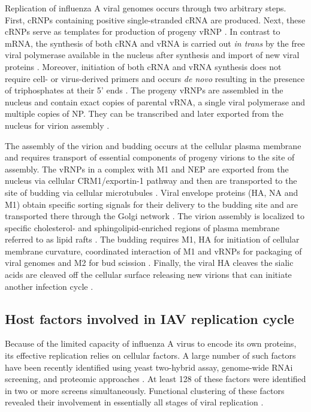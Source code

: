 	Replication of influenza A viral genomes occurs through two arbitrary steps. First, \gls{cRNP}s containing positive single-stranded cRNA are produced. Next, these \gls{cRNP}s serve as templates for production of progeny \gls{vRNP} \parencite{Elton2005}. In contrast to mRNA, the synthesis of both cRNA and vRNA is carried out \textit{in trans} by the free viral polymerase available in the nucleus after synthesis and import of new viral proteins \parencite{Jorba2009, Moeller2012}. Moreover, initiation of both cRNA and vRNA synthesis does not require cell- or virus-derived primers and occurs \textit{de novo} resulting in the presence of triphosphates at their 5' ends \parencite{Hay1982, Zhang2010}. The progeny \gls{vRNP}s are assembled in the nucleus and contain exact copies of parental vRNA, a single viral polymerase and multiple copies of \gls{NP}. They can be transcribed and later exported from the nucleus for virion assembly \parencite{Resa-Infante2011}. 
	
	The assembly of the virion and budding occurs at the cellular plasma membrane and requires transport of essential components of progeny virions to the site of assembly. The \gls{vRNP}s in a complex with \gls{M1} and \gls{NEP} are exported from the nucleus via cellular CRM1/exportin-1 pathway and then are transported to the site of budding via cellular microtubules \parencite{Akarsu2003, Momose2007, Kawaguchi2012}. Viral envelope proteins (\gls{HA}, \gls{NA} and \gls{M1}) obtain specific sorting signals for their delivery to the budding site \parencite{Hughey1992, Kundu1996, Tall2003} and are transported there through the Golgi network \parencite{Daniels-Holgate1989}. The virion assembly is localized to specific  cholesterol- and sphingolipid-enriched regions of plasma membrane referred to as lipid rafts \parencite{Scheiffele1999}. The budding requires \gls{M1}, \gls{HA} for initiation of cellular membrane curvature, coordinated interaction of \gls{M1} and \gls{vRNP}s for packaging of viral genomes and \gls{M2} for bud scission \parencite{Nayak2009a, Rossman2011}. Finally, the viral \gls{HA} cleaves the sialic acids are cleaved off the cellular surface releasing new virions that can initiate another infection cycle \parencite{Barman2004}.

	
	\subsection{Host factors involved in IAV replication cycle}
	
	Because of the limited capacity of influenza A virus to encode its own proteins, its effective replication relies on cellular factors. A large number of such factors have been recently identified using yeast two-hybrid assay, genome-wide RNAi screening, and proteomic approaches \parencite{Mayer2007, Brass2009, Shapira2009, Hao2008, Karlas2010, Konig2010, Shaw2011, Song2011}. At least 128 of these factors were identified in two or more screens simultaneously. Functional clustering of these factors revealed their involvement in essentially all stages of viral replication \parencite{Watanabe2010}. 
	
